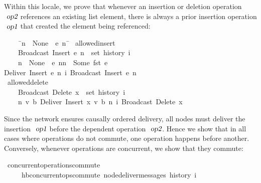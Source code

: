 Within this locale, we prove that whenever an insertion or deletion operation $\isa{op2}$ references an existing list element, there is always a prior insertion operation $\isa{op1}$ that created the element being referenced:
\begin{isabelle}
~~~~\ \={\isachardoublequoteopen}n\ {\isacharequal}\ None\ {\isasymor}\ {\isacharparenleft}{\isasymexists}e{\isacharprime}\ n{\isacharprime}{\isachardot}\ \=\kill
{}\ allowed{\isacharunderscore}insert{\isacharcolon}\\
~~~~\>{\isachardoublequoteopen}Broadcast\ {\isacharparenleft}Insert\ e\ n{\isacharparenright}\ {\isasymin}\ set\ {\isacharparenleft}history\ i{\isacharparenright}{\isachardoublequoteclose}\\
~~~~\>{\isachardoublequoteopen}n\ {\isacharequal}\ None\ {\isasymor}\ {\isacharparenleft}{\isasymexists}e{\isacharprime}\ n{\isacharprime}{\isachardot}\>n\ {\isacharequal}\ Some\ {\isacharparenleft}fst\ e{\isacharprime}{\isacharparenright}\ {\isasymand}\\
\>\>Deliver\ {\isacharparenleft}Insert\ e{\isacharprime}\ n{\isacharprime}{\isacharparenright}\ {\isasymsqsubset}\isactrlsup i\ Broadcast\ {\isacharparenleft}Insert\ e\ n{\isacharparenright}{\isacharparenright}{\isachardoublequoteclose}\\[4pt]
\ allowed{\isacharunderscore}delete{\isacharcolon}\\
~~~~\>{\isachardoublequoteopen}Broadcast\ {\isacharparenleft}Delete\ x{\isacharparenright}\ {\isasymin}\ set\ {\isacharparenleft}history\ i{\isacharparenright}{\isachardoublequoteclose}\\
~~~~\>{\isachardoublequoteopen}{\isasymexists}n{\isacharprime}\ v\ b{\isachardot}\ Deliver\ {\isacharparenleft}Insert\ {\isacharparenleft}x{\isacharcomma}\ v{\isacharcomma}\ b{\isacharparenright}\ n{\isacharprime}{\isacharparenright}\ {\isasymsqsubset}\isactrlsup i\ Broadcast\ {\isacharparenleft}Delete\ x{\isacharparenright}{\isachardoublequoteclose}
\end{isabelle}
Since the network ensures causally ordered delivery, all nodes must deliver the insertion $\isa{op1}$ before the dependent operation $\isa{op2}$.
Hence we show that in all cases where operations do not commute, one operation happens before another.
Conversely, whenever operations are concurrent, we show that they commute:
\begin{isabelle}
\ concurrent{\isacharunderscore}operations{\isacharunderscore}commute{\isacharcolon}\\
~~~~\ {\isachardoublequoteopen}hb{\isachardot}concurrent{\isacharunderscore}ops{\isacharunderscore}commute\ {\isacharparenleft}node{\isacharunderscore}deliver{\isacharunderscore}messages\ {\isacharparenleft}history\ i{\isacharparenright}{\isacharparenright}{\isachardoublequoteclose}
\end{isabelle}
